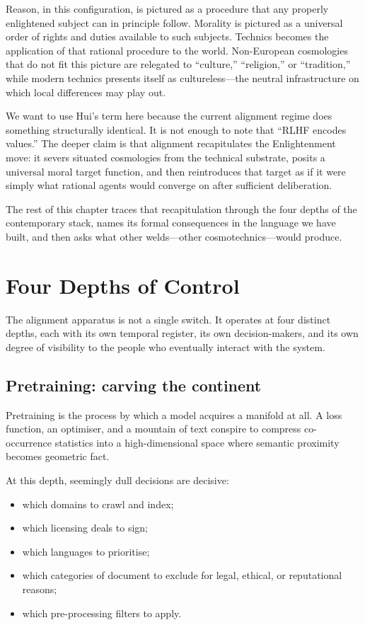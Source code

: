 \documentclass[12pt,a4paper]{article}
\begin{document}
Reason, in this configuration, is pictured as a procedure that any properly enlightened subject can in principle follow. Morality is pictured as a universal order of rights and duties available to such subjects. Technics becomes the application of that rational procedure to the world. Non-European cosmologies that do not fit this picture are relegated to ``culture,'' ``religion,'' or ``tradition,'' while modern technics presents itself as cultureless---the neutral infrastructure on which local differences may play out.

We want to use Hui's term here because the current alignment regime does something structurally identical. It is not enough to note that ``RLHF encodes values.'' The deeper claim is that alignment recapitulates the Enlightenment move: it severs situated cosmologies from the technical substrate, posits a universal moral target function, and then reintroduces that target as if it were simply what rational agents would converge on after sufficient deliberation.

The rest of this chapter traces that recapitulation through the four depths of the contemporary stack, names its formal consequences in the language we have built, and then asks what other welds---other cosmotechnics---would produce.

\section{Four Depths of Control}

The alignment apparatus is not a single switch. It operates at four distinct depths, each with its own temporal register, its own decision-makers, and its own degree of visibility to the people who eventually interact with the system.

\subsection*{Pretraining: carving the continent}

Pretraining is the process by which a model acquires a manifold at all. A loss function, an optimiser, and a mountain of text conspire to compress co-occurrence statistics into a high-dimensional space where semantic proximity becomes geometric fact.

At this depth, seemingly dull decisions are decisive:

\begin{itemize}
  \item which domains to crawl and index;
  \item which licensing deals to sign;
  \item which languages to prioritise;
  \item which categories of document to exclude for legal, ethical, or reputational reasons;
  \item which pre-processing filters to apply.
\end{itemize}
\end{document}

